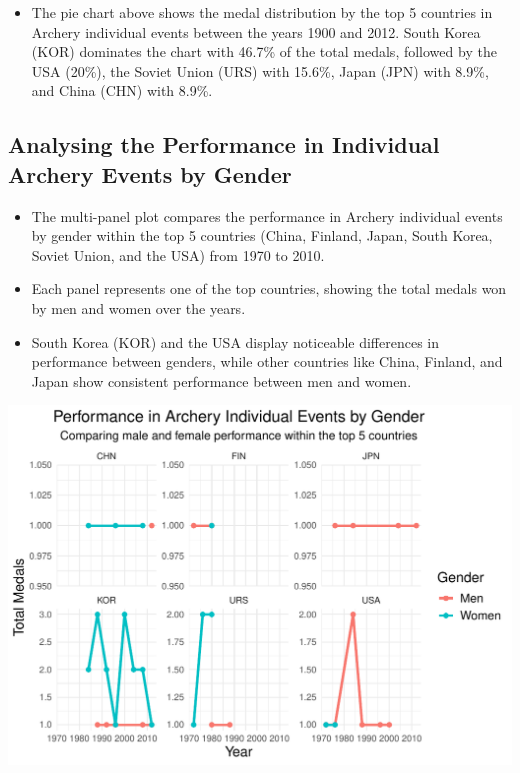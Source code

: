 \documentclass[12pt,preprint, authoryear]{elsarticle}
\let\origfigure\figure
\let\endorigfigure\endfigure
\renewenvironment{figure}[1][2] {
    \expandafter\origfigure\expandafter[H]
} {
    \endorigfigure
}
\numberwithin{equation}{section}
\numberwithin{figure}{section}
\numberwithin{table}{section}
\def\tightlist{} %
\begin{document}
\begin{itemize}
\tightlist
\item
  The pie chart above shows the medal distribution by the top 5
  countries in Archery individual events between the years 1900 and
  2012. South Korea (KOR) dominates the chart with 46.7\% of the total
  medals, followed by the USA (20\%), the Soviet Union (URS) with
  15.6\%, Japan (JPN) with 8.9\%, and China (CHN) with 8.9\%.
\end{itemize}

\hypertarget{analysing-the-performance-in-individual-archery-events-by-gender}{%
\subsection{Analysing the Performance in Individual Archery Events by
Gender}\label{analysing-the-performance-in-individual-archery-events-by-gender}}

\begin{itemize}
\item
  The multi-panel plot compares the performance in Archery individual
  events by gender within the top 5 countries (China, Finland, Japan,
  South Korea, Soviet Union, and the USA) from 1970 to 2010.
\item
  Each panel represents one of the top countries, showing the total
  medals won by men and women over the years.
\item
  South Korea (KOR) and the USA display noticeable differences in
  performance between genders, while other countries like China,
  Finland, and Japan show consistent performance between men and women.
\end{itemize}

\begin{figure}

{\centering \includegraphics{README_files/figure-latex/unnamed-chunk-6-1} 

}

\caption{The Top Countries that Dominate in both the Summer and Winter Olympics\label{Figure6}}\label{fig:unnamed-chunk-6}
\end{figure}
\end{document}
